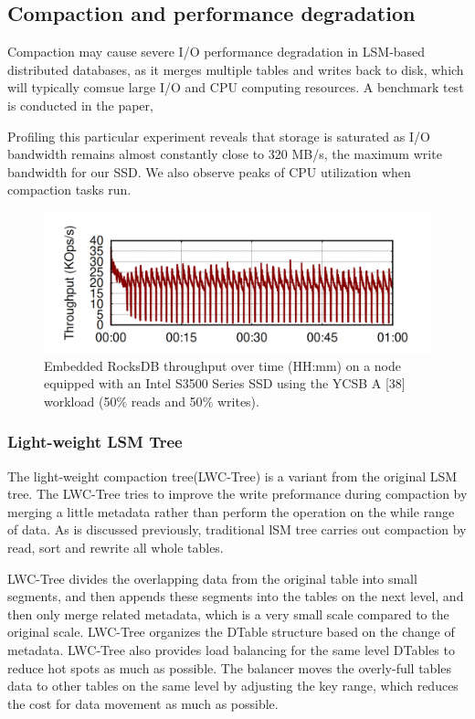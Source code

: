 \documentclass[a4paper,10pt,twoside]{article}
\begin{document}
\subsection{Compaction and performance degradation}
Compaction may cause severe I/O performance degradation in LSM-based distributed databases, 
as it merges multiple tables and writes back to disk, which will typically comsue large I/O and CPU computing resources.
A benchmark test is conducted in the paper\cite{mainpaper}, 
\begin{displayquote}
	Profiling this particular experiment
	reveals that storage is saturated as I/O bandwidth remains
	almost constantly close to 320 MB/s, the maximum write
	bandwidth for our SSD. We also observe peaks of CPU utilization
	when compaction tasks run. 
\end{displayquote}
\begin{figure}[h]
    \centering
	\includegraphics[scale=0.3]{Campaction perf.png}
    \caption{Embedded RocksDB throughput over time (HH:mm) on
	a node equipped with an Intel S3500 Series SSD using the YCSB
	A [38] workload (50$\%$ reads and 50$\%$ writes).}
    \label{fig:mesh1}
\end{figure}

\subsubsection{Light-weight LSM Tree}
The light-weight compaction tree(LWC-Tree) \cite{Yao2017ALC} is a variant from the original LSM tree. 
The LWC-Tree tries to improve the write preformance during compaction by merging a little metadata rather than perform the operation on the while range of data.
As is discussed previously, traditional lSM tree carries out compaction by read, sort and rewrite all whole tables. 
\par
LWC-Tree divides the overlapping data from the original table into small segments, and then appends these segments into the tables on the next level, 
and then only merge related metadata, which is a very small scale compared to the original scale. 
LWC-Tree organizes the DTable structure based on the change of metadata. 
LWC-Tree also provides load balancing for the same level DTables to reduce hot spots as much as possible. 
The balancer moves the overly-full tables data to other tables on the same level by adjusting the key range, which reduces the cost for data movement as much as possible.
\end{document}
